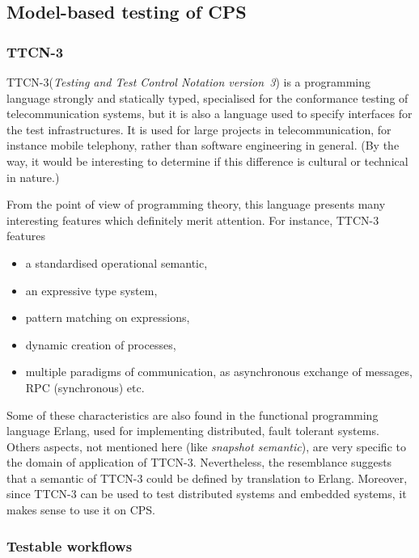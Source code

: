 \documentclass[a4paper,11pt,twoside]{article}
\newcommand\Erlang{\textsf{Erlang}\xspace}
\newcommand\TTCN{\textsf{TTCN-3}\xspace}
\begin{document}
\subsection{Model-based testing of CPS}

\subsubsection{TTCN-3}

\TTCN (\emph{Testing and Test Control Notation version~3}) is a
programming language strongly and statically typed, specialised for
the conformance testing of telecommunication systems, but it is also a
language used to specify interfaces for the test infrastructures. It
is used for large projects in telecommunication, for instance mobile
telephony, rather than software engineering in general. (By the way,
it would be interesting to determine if this difference is cultural or
technical in nature.)

From the point of view of programming theory, this language presents
many interesting features which definitely merit attention. For
instance, \TTCN features
\begin{itemize}

  \item a standardised operational semantic,

  \item an expressive type system,

  \item pattern matching on expressions,

  \item dynamic creation of processes,

  \item multiple paradigms of communication, as asynchronous exchange
    of messages, RPC (synchronous) etc.

\end{itemize}
Some of these characteristics are also found in the functional
programming language \Erlang, used for implementing distributed, fault
tolerant systems. Others aspects, not mentioned here (like
\emph{snapshot semantic}), are very specific to the domain of
application of \TTCN. Nevertheless, the resemblance suggests that a
semantic of \TTCN could be defined by translation to
\Erlang. Moreover, since \TTCN can be used to test distributed systems
and embedded systems, it makes sense to use it on CPS.

\subsubsection{Testable workflows}
\end{document}
